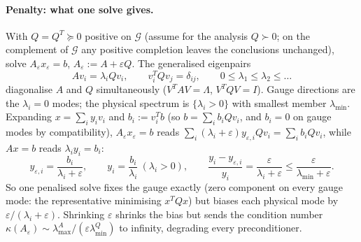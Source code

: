 \documentclass[11pt]{article}
\numberwithin{equation}{section}
\theoremstyle{remark}
\newcommand{\eps}{\varepsilon}
\begin{document}
\paragraph{Penalty: what one solve gives.} With $Q = Q^T\succeq0$ positive
on $\mathcal{G}$ (assume for the analysis $Q\succ0$; on the complement of
$\mathcal{G}$ any positive completion leaves the conclusions unchanged),
solve $A_\eps x_\eps = b$, $A_\eps := A + \eps Q$. The generalised eigenpairs
\begin{equation}
  Av_i = \lambda_iQv_i, \qquad v_i^TQv_j = \delta_{ij}, \qquad
  0\le\lambda_1\le\lambda_2\le\dots
  \label{eq:gevp}
\end{equation}
diagonalise $A$ and $Q$ simultaneously ($V^TAV = \Lambda$, $V^TQV = I$).
Gauge directions are the $\lambda_i = 0$ modes; the physical spectrum is
$\{\lambda_i > 0\}$ with smallest member $\lambda_{\min}$. Expanding
$x = \sum_iy_iv_i$ and $b_i := v_i^Tb$ (so $b = \sum_ib_iQv_i$, and
$b_i = 0$ on gauge modes by compatibility), $A_\eps x_\eps = b$ reads
$\sum_i(\lambda_i + \eps)y_{\eps,i}Qv_i = \sum_ib_iQv_i$, while $Ax = b$
reads $\lambda_iy_i = b_i$:
\begin{equation}
  y_{\eps,i} = \frac{b_i}{\lambda_i + \eps}, \qquad
  y_i = \frac{b_i}{\lambda_i}\ (\lambda_i > 0), \qquad
  \frac{y_i - y_{\eps,i}}{y_i} = \frac{\eps}{\lambda_i + \eps}
  \le\frac{\eps}{\lambda_{\min} + \eps} .
\end{equation}
So one penalised solve fixes the gauge exactly (zero component on every
gauge mode: the representative minimising $x^TQx$) but biases each physical
mode by $\eps/(\lambda_i + \eps)$. Shrinking $\eps$ shrinks the bias but
sends the condition number $\kappa(A_\eps)\sim\lambda^A_{\max}/
(\eps\lambda^Q_{\min})$ to infinity, degrading every preconditioner.
\end{document}
